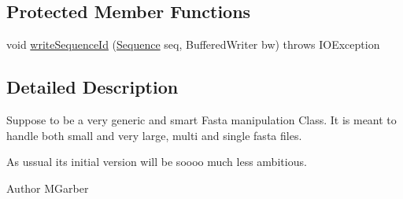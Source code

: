 \subsection*{Protected Member Functions}
\begin{DoxyCompactItemize}
\item 
void \hyperlink{classbroad_1_1core_1_1sequence_1_1_fasta_sequence_i_o_a4447a6df61c89173e8a6bd1fe5eafdbf}{write\+Sequence\+Id} (\hyperlink{classbroad_1_1core_1_1sequence_1_1_sequence}{Sequence} seq, Buffered\+Writer bw)  throws I\+O\+Exception 
\end{DoxyCompactItemize}


\subsection{Detailed Description}
Suppose to be a very generic and smart Fasta manipulation Class. It is meant to handle both small and very large, multi and single fasta files.

As ussual its initial version will be soooo much less ambitious.

\begin{DoxyAuthor}{Author}
M\+Garber 
\end{DoxyAuthor}


